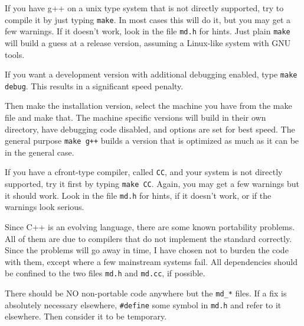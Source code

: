 If you have g++ on a unix type system that is not directly supported,
try to compile it by just typing {\tt make}.  In most cases this will
do it, but you may get a few warnings.  If it doesn't work, look in
the file {\tt md.h} for hints.  Just plain {\tt make} will build a
guess at a release version, assuming a Linux-like system with GNU
tools.

If you want a development version with additional debugging enabled,
type {\tt make debug}.  This results in a significant speed penalty.

Then make the installation version, select the machine you have from
the make file and make that.  The machine specific versions will
build in their own directory, have debugging code disabled, and
options are set for best speed.  The general purpose {\tt make g++}
builds a version that is optimized as much as it can be in the
general case.

If you have a cfront-type compiler, called {\tt CC}, and your system
is not directly supported, try it first by typing {\tt make CC}.  Again,
you may get a few warnings but it should work.  Look in the file
{\tt md.h} for hints, if it doesn't work, or if the warnings look
serious.

Since C++ is an evolving language, there are some known portability
problems.  All of them are due to compilers that do not implement the
standard correctly.  Since the problems will go away in time, I have
chosen not to burden the code with them, except where a few
mainstream systems fail.  All dependencies should be confined to the
two files {\tt md.h} and {\tt md.cc}, if possible.

There should be NO non-portable code anywhere but the {\tt md\_*}
files.  If a fix is absolutely necessary elsewhere, {\tt \#define} some
symbol in {\tt md.h} and refer to it elsewhere.  Then consider it to
be temporary.


